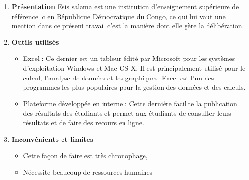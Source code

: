 \begin{enumerate}
    \item \textbf{Présentation} \newline Esis salama est une institution d'enseignement supérieure de référence ic en République Démocratique du Congo, ce qui lui vaut une mention dans ce présent travail c'est la manière dont elle gère la délibération.
    \item \textbf{Outils utilisés} 
        \begin{itemize}
            \item Excel : Ce dernier est un tableur édité par Microsoft pour les systèmes d'exploitation Windows et Mac OS X. Il est principalement utilisé pour le calcul, l'analyse de données et les graphiques. Excel est l'un des programmes les plus populaires pour la gestion des données et des calculs.
            \item Plateforme développée en interne :  Cette dernière facilite la publication des résultats des étudiants et permet aux étudiants de consulter leurs résultats et de faire des recours en ligne.
        \end{itemize}
    \item \textbf{Inconvénients et limites}
        \begin{itemize}
            \item Cette façon de faire est très chronophage,
            \item Nécessite beaucoup de ressources humaines
        \end{itemize}
\end{enumerate}
